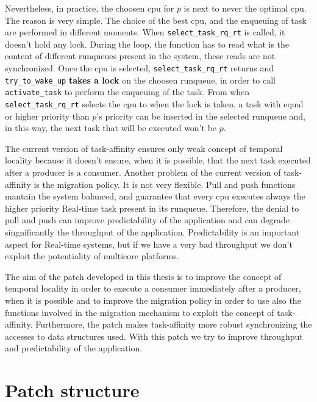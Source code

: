Nevertheless, in practice, the choosen cpu for $p$ is next to never the optimal cpu. The reason is very simple. The choice of the best 
cpu, and the enqueuing of task are performed in different moments. When \texttt{select\_task\_rq\_rt} is called, it doesn't hold any lock. During the loop, 
the function has to read what is the content of different runqueues present in the system, these reads are not synchronized. Once the cpu is selected, 
\texttt{select\_task\_rq\_rt} returns and \texttt{try\_to\_wake\_up} \textbf{takes a lock} on the choosen runqueue, in order to call 
\texttt{activate\_task} to perform the enqueuing of the task. From when \texttt{select\_task\_rq\_rt} selects the cpu to when the lock is taken, a task 
with equal or higher priority than $p$'s priority can be inserted in the selected runqueue and, in this way, the next task that will be executed won't be 
$p$. 

The current version of task-affinity ensures only weak concept of temporal locality because it doesn't ensure, when it is possible, that the next task 
executed after a producer is a consumer. Another problem of the current version of task-affinity is the migration policy. It is not very flexible. Pull 
and push functions mantain the system balanced, and guarantee that every cpu executes always the higher priority Real-time task present in its runqueue.
Therefore, the denial to pull and push can improve predictability of the application and can degrade singnificantly the throughput of the application.
Predictability is an important aspect for Real-time systems, but if we have a very bad throughput we don't exploit the potentiality of multicore platforms.

The aim of the patch developed in this thesis is to improve the concept of temporal locality in order to execute a consumer immediately after a 
producer, when it is possible and to improve the migration policy in order to use also the functions involved in the migration mechanism to exploit the 
concept of task-affinity. Furthermore, the patch makes task-affinity more robust synchronizing the accesses to data structures used. With this patch we 
try to improve throughput and predictability of the application. 

\section{Patch structure}

